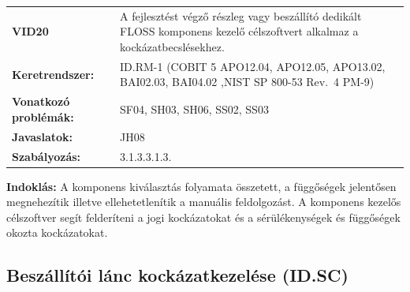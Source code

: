 \documentclass[12pt,magyar,a4paper,oneside]{scrreprt}
\begin{document}
\begin{longtable}[]{@{}ll@{}}
\toprule
\endhead
\begin{minipage}[t]{0.16\columnwidth}\raggedright
\textbf{VID20}\strut
\end{minipage} & \begin{minipage}[t]{0.79\columnwidth}\raggedright
A fejlesztést végző részleg vagy beszállító dedikált FLOSS komponens
kezelő célszoftvert alkalmaz a kockázatbecslésekhez.\strut
\end{minipage}\tabularnewline
\begin{minipage}[t]{0.16\columnwidth}\raggedright
\textbf{Keretrendszer:}\strut
\end{minipage} & \begin{minipage}[t]{0.79\columnwidth}\raggedright
ID.RM-1 (COBIT 5 APO12.04, APO12.05, APO13.02, BAI02.03, BAI04.02 ,NIST
SP 800-53 Rev.~4 PM-9)\strut
\end{minipage}\tabularnewline
\begin{minipage}[t]{0.16\columnwidth}\raggedright
\textbf{Vonatkozó problémák:}\strut
\end{minipage} & \begin{minipage}[t]{0.79\columnwidth}\raggedright
SF04, SH03, SH06, SS02, SS03\strut
\end{minipage}\tabularnewline
\begin{minipage}[t]{0.16\columnwidth}\raggedright
\textbf{Javaslatok:}\strut
\end{minipage} & \begin{minipage}[t]{0.79\columnwidth}\raggedright
JH08\strut
\end{minipage}\tabularnewline
\begin{minipage}[t]{0.16\columnwidth}\raggedright
\textbf{Szabályozás:}\strut
\end{minipage} & \begin{minipage}[t]{0.79\columnwidth}\raggedright
3.1.3.3.1.3.\strut
\end{minipage}\tabularnewline
\bottomrule
\end{longtable}

\textbf{Indoklás: } A komponens kiválasztás folyamata összetett, a
függőségek jelentősen megnehezítik illetve ellehetetlenítik a manuális
feldolgozást. A komponens kezelős célszoftver segít felderíteni a jogi
kockázatokat és a sérülékenységek és függőségek okozta kockázatokat.

\hypertarget{beszuxe1lluxedtuxf3i-luxe1nc-kockuxe1zatkezeluxe9se-id.sc}{%
\subsection{Beszállítói lánc kockázatkezelése
(ID.SC)}\label{beszuxe1lluxedtuxf3i-luxe1nc-kockuxe1zatkezeluxe9se-id.sc}}
\end{document}
